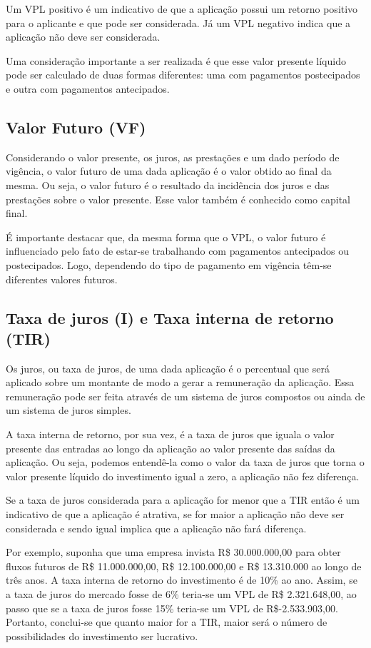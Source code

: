 Um VPL positivo é um indicativo de que a aplicação possui um retorno positivo para o aplicante e que pode ser considerada. Já um VPL negativo indica que a aplicação não deve ser considerada. \cite{vpl}

Uma consideração importante a ser realizada é que esse valor presente líquido pode ser calculado de duas formas diferentes: uma com pagamentos postecipados e outra com pagamentos antecipados.

\subsection{Valor Futuro (VF)}

Considerando o valor presente, os juros, as prestações e um dado período de vigência, o valor futuro de uma dada aplicação é o valor obtido ao final da mesma. Ou seja, o valor futuro é o resultado da incidência dos juros e das prestações sobre o valor presente. Esse valor também é conhecido como capital final.

É importante destacar que, da mesma forma que o VPL, o valor futuro é influenciado pelo fato de estar-se trabalhando com pagamentos antecipados ou postecipados. Logo, dependendo do tipo de pagamento em vigência têm-se diferentes valores futuros.

\subsection{Taxa de juros (I) e Taxa interna de retorno (TIR)}

Os juros, ou taxa de juros, de uma dada aplicação é o percentual que será aplicado sobre um montante de modo a gerar a remuneração da aplicação. Essa remuneração pode ser feita através de um sistema de juros compostos ou ainda de um sistema de juros simples.

A taxa interna de retorno, por sua vez, é a taxa de juros que iguala o valor presente das entradas ao longo da aplicação ao valor presente das saídas da aplicação. Ou seja, podemos entendê-la como o valor da taxa de juros que torna o valor presente líquido do investimento igual a zero, a aplicação não fez diferença.

Se a taxa de juros considerada para a aplicação for menor que a TIR então é um indicativo de que a aplicação é atrativa, se for maior a aplicação não deve ser considerada e sendo igual implica que a aplicação não fará diferença\cite{irr}. 

Por exemplo, suponha que uma empresa invista R\$ 30.000.000,00 para obter fluxos futuros de R\$ 11.000.000,00, R\$ 12.100.000,00 e R\$ 13.310.000 ao longo de três anos. A taxa interna de retorno do investimento é de 10\% ao ano. Assim, se a taxa de juros do mercado fosse de 6\% teria-se um VPL de R\$ 2.321.648,00, ao passo que se a taxa de juros fosse 15\% teria-se um VPL de R\$-2.533.903,00. Portanto, conclui-se que quanto maior for a TIR, maior será o número de possibilidades do investimento ser lucrativo. 

